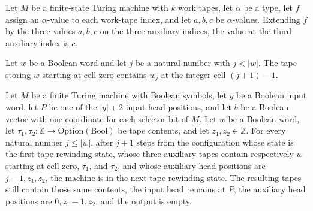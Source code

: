 \begin{theorem}
\label{Complexity.Meyer.aux_read2}
\leanok
{}
Let $M$ be a finite-state Turing machine with $k$ work tapes, let $\alpha$ be a type,
let $f$ assign an $\alpha$-value to each work-tape index, and let $a,b,c$ be
$\alpha$-values. Extending $f$ by the three values $a,b,c$ on the three auxiliary
indices, the value at the third auxiliary index is $c$.
\end{theorem}

\begin{theorem}
\label{Complexity.Meyer.bufferTape_pred}
\leanok
{}
Let $w$ be a Boolean word and let $j$ be a natural number with $j<|w|$. The tape storing
$w$ starting at cell zero contains $w_j$ at the integer cell $(j+1)-1$.
\end{theorem}

\begin{theorem}
\label{Complexity.Meyer.rewX_run}
\leanok
{}
Let $M$ be a finite Turing machine with Boolean symbols, let $y$ be a Boolean input
word, let $P$ be one of the $|y|+2$ input-head positions, and let $b$ be a Boolean
vector with one coordinate for each selector bit of $M$. Let $w$ be a Boolean word, let
$\tau_1,\tau_2:\mathbb{Z}\to\mathrm{Option}(\mathrm{Bool})$ be tape contents, and let
$z_1,z_2\in\mathbb{Z}$. For every natural number $j\le |w|$, after $j+1$ steps from the
configuration whose state is the first-tape-rewinding state, whose three auxiliary tapes
contain respectively $w$ starting at cell zero, $\tau_1$, and $\tau_2$, and whose
auxiliary head positions are $j-1,z_1,z_2$, the machine is in the next-tape-rewinding
state. The resulting tapes still contain those same contents, the input head remains at
$P$, the auxiliary head positions are $0,z_1-1,z_2$, and the output is empty.
\end{theorem}

